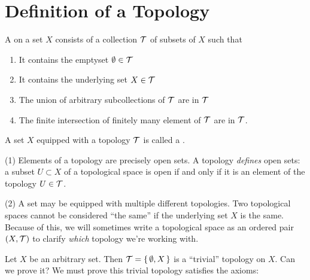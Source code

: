 \section{Definition of a Topology}
\begin{defn}\label{defn:topology}
  A  on a set $X$ consists of a collection
  $\mathcal{T}$ of subsets of $X$ such that
  \begin{enumerate}
  \item It contains the emptyset $\emptyset\in\mathcal{T}$
  \item It contains the underlying set $X\in\mathcal{T}$
  \item The union of arbitrary subcollections of $\mathcal{T}$ are in
    $\mathcal{T}$
  \item The finite intersection of finitely many element of
    $\mathcal{T}$ are in $\mathcal{T}$.
  \end{enumerate}
  A set $X$ equipped with a topology $\mathcal{T}$ is called a
  .
\end{defn}
(1) Elements of a topology are precisely open sets. A topology \emph{defines}
open sets: a subset $U\subset X$ of a topological space is open if and
only if it is an element of the topology $U\in\mathcal{T}$.

(2) A set may be equipped with multiple different topologies. Two
topological spaces cannot be considered ``the same'' if the underlying
set $X$ is the same. Because of this, we will sometimes write a
topological space as an ordered pair $(X,\mathcal{T})$ to clarify
\emph{which} topology we're working with.


Let $X$ be an arbitrary set. Then $\mathcal{T}=\{\,\emptyset, X\,\}$ is a
``trivial'' topology on $X$. Can we prove it? We must prove this trivial
topology satisfies the axioms:

